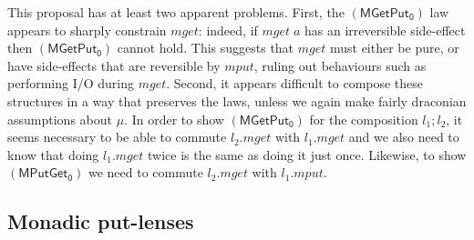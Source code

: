 \documentclass[runningheads]{llncs}
\newcommand{\Varid}[1]{\mathit{#1}}
\def\resethooks{\global\let\SaveRestoreHook\empty
  \global\let\ColumnHook\empty}
\let\hspost\empty
\begin{document}
\resethooks

This proposal has at least two apparent problems.  First, the
\ensuremath{\mathsf{(MGetPut_0)}} law appears to sharply constrain \ensuremath{\Varid{mget}}: indeed, if \ensuremath{\Varid{mget}\;\Varid{a}}
has an irreversible side-effect then \ensuremath{\mathsf{(MGetPut_0)}} 
cannot hold.  This
suggests that \ensuremath{\Varid{mget}} must either be pure, or have side-effects that
are reversible by \ensuremath{\Varid{mput}}, ruling out behaviours such as performing I/O
during \ensuremath{\Varid{mget}}.  Second, it appears difficult to compose these
structures in a way that preserves the laws, unless we again make
fairly draconian assumptions about \ensuremath{\mu}.  
In order to show \ensuremath{\mathsf{(MGetPut_0)}} for the composition \ensuremath{\Varid{l}_{1}\mathbin{;}\Varid{l}_{2}}, it seems necessary to be able to commute \ensuremath{\Varid{l}_{2}\mathord{.}\Varid{mget}} with \ensuremath{\Varid{l}_{1}\mathord{.}\Varid{mget}}
and we also need to know that doing \ensuremath{\Varid{l}_{1}\mathord{.}\Varid{mget}} 
twice is the same as doing it
just once. Likewise, to show \ensuremath{\mathsf{(MPutGet_0)}} we need to commute \ensuremath{\Varid{l}_{2}\mathord{.}\Varid{mget}} with
\ensuremath{\Varid{l}_{1}\mathord{.}\Varid{mput}}.  



\subsection{Monadic put-lenses}
\end{document}
